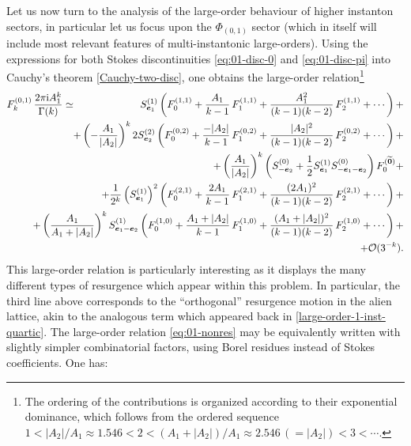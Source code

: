 \documentclass[11pt,a4paper]{article}
\begin{document}
Let us now turn to the analysis of the large-order behaviour of higher instanton sectors, in particular let us focus upon the $\Phi_{(0,1)}$ sector (which in itself will include most relevant features of multi-instantonic large-orders). Using the expressions for both Stokes discontinuities \eqref{eq:01-disc-0} and \eqref{eq:01-disc-pi} into Cauchy's theorem \eqref{Cauchy-two-disc}, one obtains the large-order relation\footnote{The ordering of the contributions is organized according to their exponential dominance, which follows from the ordered sequence $1 < |A_2|/A_1 \approx 1.546 < 2 < (A_1+|A_2|)/A_1 \approx 2.546\, ( = |A_2| ) < 3 < \cdots$.}
%
\begin{eqnarray}
\label{eq:01-nonres}
F_k^{(0,1)}\, \frac{2\pi\mathrm{i}A_1^k}{\Gamma(k)} &\simeq& S^{(1)}_{\boldsymbol{e}_1} \left( F^{(1,1)}_0 + \frac{A_1}{k-1}\, F^{(1,1)}_1 + \frac{A_1^2}{(k-1)(k-2)}\, F^{(1,1)}_2 + \cdots \right) + \\
&&
\hspace{-50pt}
+ \left( -\frac{A_1}{|A_2|} \right)^k 2 S^{(2)}_{\boldsymbol{e}_2} \left( F^{(0,2)}_0 + \frac{-|A_2|}{k-1}\, F^{(0,2)}_1 + \frac{|A_2|^2}{(k-1)(k-2)}\, F^{(0,2)}_2 + \cdots \right) + \nonumber \\
&& 
\hspace{-50pt}
+ \left( \frac{A_1}{|A_2|} \right)^k \left( S^{(0)}_{-\boldsymbol{e}_2} + \frac{1}{2} S^{(1)}_{\boldsymbol{e}_1} S^{(0)}_{-\boldsymbol{e}_1-\boldsymbol{e}_2} \right) F_0^{(\widetilde{\boldsymbol{0}})} + \nonumber \\
&&
\hspace{-50pt}
+ \frac{1}{2^k} \left( S^{(1)}_{\boldsymbol{e}_1} \right)^2 \left( F^{(2,1)}_0 + \frac{2A_1}{k-1}\, F^{(2,1)}_1 + \frac{(2A_1)^2}{(k-1)(k-2)}\, F^{(2,1)}_2 + \cdots \right) + \nonumber \\
&&
\hspace{-50pt}
+ \left( \frac{A_1}{A_1+|A_2|} \right)^k S^{(1)}_{\boldsymbol{e}_1-\boldsymbol{e}_2} \left( F^{(1,0)}_0 + \frac{A_1+|A_2|}{k-1}\, F^{(1,0)}_1 + \frac{(A_1+|A_2|)^2}{(k-1)(k-2)}\, F^{(1,0)}_2 + \cdots \right) + \nonumber \\
&&
\hspace{-50pt}
+ \mathcal{O} (3^{-k}). \nonumber
\end{eqnarray} 
%
\noindent
This large-order relation is particularly interesting as it displays the many different types of resurgence which appear within this problem. In particular, the third line above corresponds to the ``orthogonal'' resurgence motion in the alien lattice, akin to the analogous term which appeared back in \eqref{large-order-1-inst-quartic}. The large-order relation \eqref{eq:01-nonres} may be equivalently written with slightly simpler combinatorial factors, using Borel residues instead of Stokes coefficients. One has:
\end{document}
